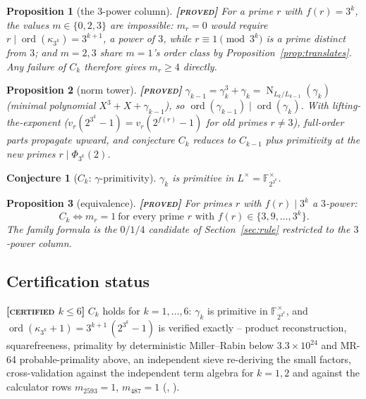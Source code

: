 \documentclass[11pt]{article}
\theoremstyle{plain}
\newtheorem{proposition}{Proposition}
\newtheorem{conjecture}{Conjecture}
\theoremstyle{definition}
\newcommand{\F}{\mathbb{F}}
\newcommand{\ord}{\operatorname{ord}}
\newcommand{\Norm}{\operatorname{N}}
\newcommand{\PROVED}{\textbf{[\textsc{proved}]}}
\newcommand{\CERTIFIED}[1]{\textbf{[\textsc{certified} $#1$]}}
\begin{document}
\begin{proposition}[the $3$-power column]\label{prop:column}
\PROVED{} For a prime $r$ with $f(r)=3^k$, the values $m\in\{0,2,3\}$ are
impossible: $m_r=0$ would require $r\mid\ord(\kappa_{3^k})=3^{k+1}$, a
power of $3$, while $r\equiv1\pmod{3^k}$ is a prime distinct from $3$;
and $m=2,3$ share $m=1$'s order class by
Proposition~\ref{prop:translates}. Any failure of $C_k$ therefore gives
$m_r\geq4$ directly.
\end{proposition}

\begin{proposition}[norm tower]\label{prop:tower}
\PROVED{} $\gamma_{k-1}=\gamma_k^3+\gamma_k
=\Norm_{L_k/L_{k-1}}(\gamma_k)$ (minimal polynomial
$X^3+X+\gamma_{k-1}$), so $\ord(\gamma_{k-1})\mid\ord(\gamma_k)$. With
lifting-the-exponent ($v_r(2^{3^k}-1)=v_r(2^{f(r)}-1)$ for old primes
$r\neq3$), full-order parts propagate upward, and conjecture $C_k$
reduces to $C_{k-1}$ plus primitivity at the new primes
$r\mid\Phi_{3^k}(2)$.
\end{proposition}

\begin{conjecture}[$C_k$: $\gamma$-primitivity]\label{conj:ck}
$\gamma_k$ is primitive in $L^{\times}=\F_{2^{3^k}}^{\times}$.
\end{conjecture}

\begin{proposition}[equivalence]\label{prop:equiv}
\PROVED{} For primes $r$ with $f(r)\mid 3^k$ a $3$-power:
\[
  C_k
  \iff
  m_r=1\ \text{for every prime $r$ with } f(r)\in\{3,9,\dots,3^k\}.
\]
The family formula is the $0/1/4$ candidate of Section~\ref{sec:rule}
restricted to the $3$-power column.
\end{proposition}

\subsection{Certification status}

\CERTIFIED{k\leq6} $C_k$ holds for $k=1,\dots,6$: $\gamma_k$ is primitive
in $\F_{2^{3^k}}^{\times}$, and
$\ord(\kappa_{3^k}+1)=3^{k+1}\,(2^{3^k}-1)$ is verified exactly --
product reconstruction, squarefreeness, primality by deterministic
Miller--Rabin below $3.3\times10^{24}$ and MR-64 probable-primality above,
an independent sieve re-deriving the small factors, cross-validation
against the independent term algebra for $k=1,2$ and against the
calculator rows $m_{2593}=1$, $m_{487}=1$
(,
).
\end{document}
